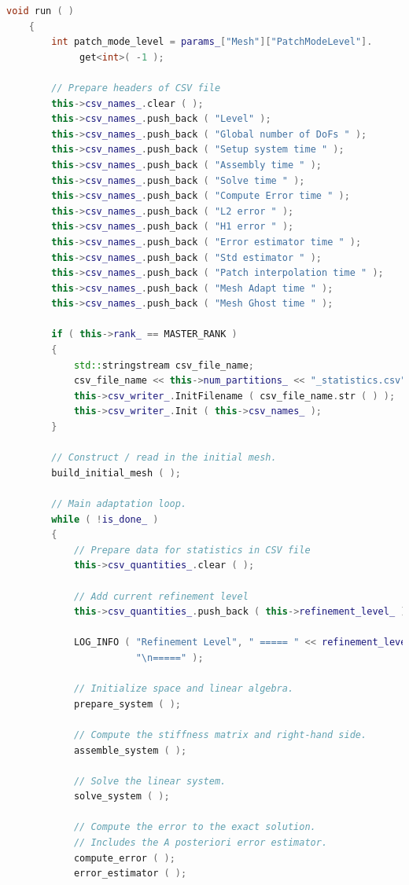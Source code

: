 \documentclass[a4paper, 11pt, twoside]{article}
\begin{document}
\begin{lstlisting}[language=C++, basicstyle={\footnotesize, \ttfamily}, keywordstyle=\color{blue}, numbers=none, tabsize=4]
    void run ( )
    {
        int patch_mode_level = params_["Mesh"]["PatchModeLevel"].
             get<int>( -1 );

        // Prepare headers of CSV file
        this->csv_names_.clear ( );
        this->csv_names_.push_back ( "Level" );
        this->csv_names_.push_back ( "Global number of DoFs " );
        this->csv_names_.push_back ( "Setup system time " );
        this->csv_names_.push_back ( "Assembly time " );
        this->csv_names_.push_back ( "Solve time " );
        this->csv_names_.push_back ( "Compute Error time " );
        this->csv_names_.push_back ( "L2 error " );
        this->csv_names_.push_back ( "H1 error " );
        this->csv_names_.push_back ( "Error estimator time " );
        this->csv_names_.push_back ( "Std estimator " );
        this->csv_names_.push_back ( "Patch interpolation time " );
        this->csv_names_.push_back ( "Mesh Adapt time " );
        this->csv_names_.push_back ( "Mesh Ghost time " );

        if ( this->rank_ == MASTER_RANK )
        {
            std::stringstream csv_file_name;
            csv_file_name << this->num_partitions_ << "_statistics.csv";
            this->csv_writer_.InitFilename ( csv_file_name.str ( ) );
            this->csv_writer_.Init ( this->csv_names_ );
        }

        // Construct / read in the initial mesh.
        build_initial_mesh ( );

        // Main adaptation loop.
        while ( !is_done_ )
        {
            // Prepare data for statistics in CSV file
            this->csv_quantities_.clear ( );

            // Add current refinement level
            this->csv_quantities_.push_back ( this->refinement_level_ );

            LOG_INFO ( "Refinement Level", " ===== " << refinement_level_ << 
                       "\n=====" );

            // Initialize space and linear algebra.
            prepare_system ( );

            // Compute the stiffness matrix and right-hand side.
            assemble_system ( );

            // Solve the linear system.
            solve_system ( );

            // Compute the error to the exact solution.
            // Includes the A posteriori error estimator.
            compute_error ( );
            error_estimator ( );


\end{lstlisting}
\end{document}
